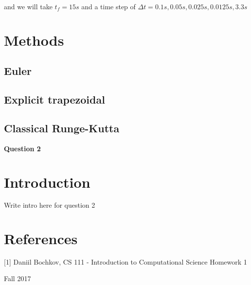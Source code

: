 \documentclass[12pt]{article}
\begin{document}
and we will take $t_f = 15s$ and a time step of $\Delta t = 0.1s, 0.05s, 0.025s, 0.0125s, 3.3 s$

\section{Methods}\label{sec::Euler, RK2, RK4}

\subsection{Euler}\label{sec::euler}

\subsection{Explicit trapezoidal}\label{sec::RK2}

\subsection{Classical Runge-Kutta}\label{sec::RK4}









\newpage
\clearpage
\centerline{\Large\textbf{Question 2}}
\section{Introduction}\label{sec::Intro}
Write intro here for question 2




\newpage
\clearpage
\setcounter{page}{1} \pagestyle{empty}
\section{References}\label{sec::References}
[1] Daniil Bochkov, CS 111 - Introduction to Computational Science Homework 1

    Fall 2017

\end{document}
